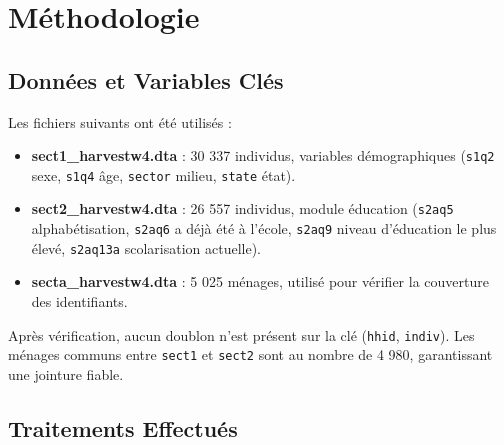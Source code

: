 \documentclass[
  11pt,
]{article}
\begin{document}
\section{Méthodologie}\label{muxe9thodologie}

\subsection{Données et Variables
Clés}\label{donnuxe9es-et-variables-cluxe9s}

Les fichiers suivants ont été utilisés :

\begin{itemize}
\item
  \textbf{sect1\_harvestw4.dta} : 30 337 individus, variables
  démographiques (\texttt{s1q2} sexe, \texttt{s1q4} âge, \texttt{sector}
  milieu, \texttt{state} état).
\item
  \textbf{sect2\_harvestw4.dta} : 26 557 individus, module éducation
  (\texttt{s2aq5} alphabétisation, \texttt{s2aq6} a déjà été à l'école,
  \texttt{s2aq9} niveau d'éducation le plus élevé, \texttt{s2aq13a}
  scolarisation actuelle).
\item
  \textbf{secta\_harvestw4.dta} : 5 025 ménages, utilisé pour vérifier
  la couverture des identifiants.
\end{itemize}

Après vérification, aucun doublon n'est présent sur la clé
(\texttt{hhid}, \texttt{indiv}). Les ménages communs entre
\texttt{sect1} et \texttt{sect2} sont au nombre de 4 980, garantissant
une jointure fiable.

\subsection{Traitements Effectués}\label{traitements-effectuuxe9s}
\end{document}

